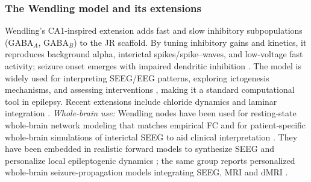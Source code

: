 \documentclass[12pt]{article}
\numberwithin{equation}{section}
\begin{document}
\subsubsection*{The Wendling model and its extensions}
Wendling’s CA1-inspired extension adds fast and slow inhibitory subpopulations (GABA$_A$, GABA$_B$) to the JR scaffold. By tuning inhibitory gains and kinetics, it reproduces background alpha, interictal spikes/spike–waves, and low-voltage fast activity; seizure onset emerges with impaired dendritic inhibition \cite{Wendling2002}. The model is widely used for interpreting SEEG/EEG patterns, exploring ictogenesis mechanisms, and assessing interventions \cite{Wendling2016Review}, making it a standard computational tool in epilepsy. Recent extensions include chloride dynamics and laminar integration \cite{lopez-solaPersonalizableAutonomousNeural2022}.
\textit{Whole-brain use:} Wendling nodes have been used for resting‑state whole‑brain network modeling that matches empirical FC \cite{Cui2024WendlingWBNM} and for patient‑specific whole‑brain simulations of interictal SEEG to aid clinical interpretation \cite{KoksalErsuz2024SEEGWB}.
They have been embedded in realistic forward models to synthesize SEEG and personalize local epileptogenic dynamics \cite{lopez-solaPersonalizableAutonomousNeural2022}; the same group reports personalized whole‑brain seizure‑propagation models integrating SEEG, MRI and dMRI \cite{LopezSola2025WB}.
\end{document}
